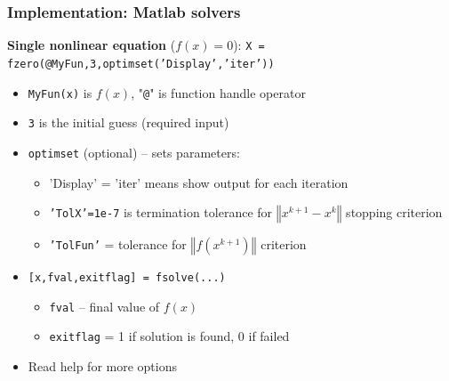 \documentclass[bigger]{beamer}
\begin{document}
\begin{frame}%
\frametitle{Implementation: Matlab solvers}

\textbf{Single nonlinear equation} ($f(x)=0$):\newline
\qquad \texttt{X = fzero(@MyFun,3,optimset('Display','iter'))}

\begin{itemize}
\item \texttt{MyFun(x)} is $f(x)$, "\texttt{@}" is function handle operator

\item \texttt{3} is the initial guess (required input)

\item \texttt{optimset} (optional) -- sets parameters:

\begin{itemize}
\item 'Display' = 'iter' means show output for each iteration

\item \texttt{'TolX'=1e-7} is termination tolerance for \newline
$\left\Vert x^{k+1}-x^{k}\right\Vert $ stopping criterion

\item \texttt{'TolFun'} = tolerance for $\left\Vert f(x^{k+1})\right\Vert $
criterion
\end{itemize}

\item \texttt{[x,fval,exitflag] = fsolve(...)}

\begin{itemize}
\item \texttt{fval} -- final value of $f(x)$

\item \texttt{exitflag} = 1 if solution is found, \TEXTsymbol{<} 0 if failed
\end{itemize}

\item Read help for more options
\end{itemize}

\end{frame}%
\end{document}
